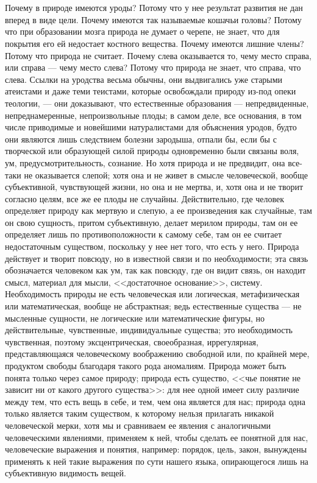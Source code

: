 \documentclass[12pt]{article}
\begin{document}
\section{}

Почему в природе имеются уроды? Потому что у нее результат развития не дан вперед в виде цели. Почему имеются так называемые кошачьи головы? Потому что при образовании мозга природа не думает о черепе, не знает, что для покрытия его ей недостает костного вещества. Почему имеются лишние члены? Потому что природа не считает. Почему слева оказывается то, чему место справа, или справа --- чему место слева? Потому что природа не знает, что справа, что слева. Ссылки на уродства весьма обычны, они выдвигались уже старыми атеистами и даже теми теистами, которые освобождали природу из-под опеки теологии, --- они доказывают, что естественные образования --- непредвиденные, непреднамеренные, непроизвольные плоды; в самом деле, все основания, в том числе приводимые и новейшими натуралистами для объяснения уродов, будто они являются лишь следствием болезни зародыша, отпали бы, если бы с творческой или образующей силой природы одновременно были связаны воля, ум, предусмотрительность, сознание. Но хотя природа и не предвидит, она все-таки не оказывается слепой; хотя она и не живет в смысле человеческой, вообще субъективной, чувствующей жизни, но она и не мертва, и, хотя она и не творит согласно целям, все же ее плоды не случайны. Действительно, где человек определяет природу как мертвую и слепую, а ее произведения как случайные, там он свою сущность, притом субъективную, делает мерилом природы, там он ее определяет лишь по противоположности к самому себе, там он ее считает недостаточным существом, поскольку у нее нет того, что есть у него. Природа действует и творит повсюду, но в известной связи и по необходимости; эта связь обозначается человеком как ум, так как повсюду, где он видит связь, он находит смысл, материал для мысли, <<достаточное основание>>, систему. Необходимость природы не есть человеческая или логическая, метафизическая или математическая, вообще не абстрактная; ведь естественные существа --- не мысленные сущности, не логические или математические фигуры, но действительные, чувственные, индивидуальные существа; это необходимость чувственная, поэтому эксцентрическая, своеобразная, иррегулярная, представляющаяся человеческому воображению свободной или, по крайней мере, продуктом свободы благодаря такого рода аномалиям. Природа может быть понята только через самое природу; природа есть существо, <<чье понятие не зависит ни от какого другого существа>>: для нее одной имеет силу различие между тем, что есть вещь в себе, и тем, чем она является для нас; природа одна только является таким существом, к которому нельзя прилагать никакой человеческой мерки, хотя мы и сравниваем ее явления с аналогичными человеческими явлениями, применяем к ней, чтобы сделать ее понятной для нас, человеческие выражения и понятия, например: порядок, цель, закон, вынуждены применять к ней такие выражения по сути нашего языка, опирающегося лишь на субъективную видимость вещей.
\end{document}
